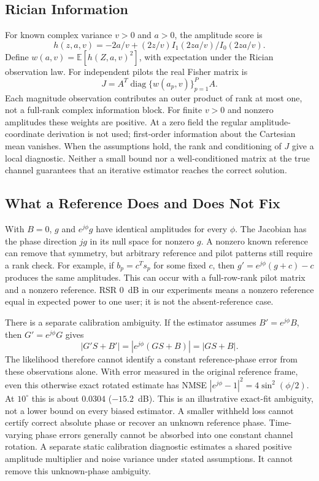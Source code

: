 \documentclass[journal]{IEEEtran}
\DeclareMathOperator{\diag}{diag}
\begin{document}
\subsection{Rician Information}
For known complex variance $v>0$ and $a>0$, the amplitude score is
\begin{equation}
 h(z,a,v)=-2a/v+(2z/v)I_1(2za/v)/I_0(2za/v).
\end{equation}
Define $w(a,v)=\mathbb E[h(Z,a,v)^2]$, with expectation under the
Rician observation law. For independent pilots the real Fisher matrix is
\begin{equation}
 J=A^T\diag\{w(a_p,v)\}_{p=1}^P A.
\end{equation}
Each magnitude observation contributes an outer product of rank at most one, not a
full-rank complex information block. For finite $v>0$ and nonzero
amplitudes these weights are positive. At a zero field the regular
amplitude-coordinate derivation is not used; first-order information
about the Cartesian mean vanishes. When the assumptions hold, the
rank and conditioning of $J$ give a local diagnostic. Neither a small
bound nor a well-conditioned matrix at the true channel guarantees that
an iterative estimator reaches the correct solution.

\subsection{What a Reference Does and Does Not Fix}
With $B=0$, $g$ and $e^{j\phi}g$ have identical amplitudes for every
$\phi$. The Jacobian has the phase direction $jg$ in its null space for
nonzero $g$. A nonzero known reference can remove that symmetry, but
arbitrary reference and pilot patterns still require a rank check. For
example, if $b_p=c^Ts_p$ for some fixed $c$, then
$g'=e^{j\phi}(g+c)-c$ produces the same amplitudes. This can occur
with a full-row-rank pilot matrix and a nonzero reference.
RSR $0$~dB in our experiments means a nonzero reference equal in expected
power to one user; it is not the absent-reference case.

There is a separate calibration ambiguity. If the estimator assumes
$B'=e^{j\phi}B$, then $G'=e^{j\phi}G$ gives
\begin{equation}
 |G'S+B'|=|e^{j\phi}(GS+B)|=|GS+B|.
\end{equation}
The likelihood therefore cannot identify a constant reference-phase error
from these observations alone. With error measured in the original
reference frame, even this otherwise exact rotated estimate has NMSE
$|e^{j\phi}-1|^2=4\sin^2(\phi/2)$. At $10^\circ$ this is about
$0.0304$ ($-15.2$~dB). This is an illustrative exact-fit ambiguity, not
a lower bound on every biased estimator. A smaller withheld loss cannot
certify correct absolute phase or recover an unknown reference phase.
Time-varying phase errors generally cannot be absorbed into one constant
channel rotation. A separate static calibration diagnostic estimates a
shared positive amplitude multiplier and noise variance under stated
assumptions. It cannot remove this unknown-phase ambiguity.
\end{document}
